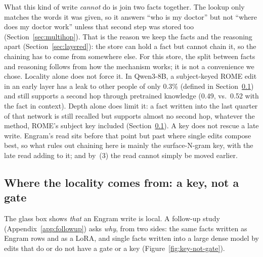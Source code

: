 \documentclass[11pt]{article}
\begin{document}
What this kind of write \emph{cannot} do is join two facts together.
The lookup only matches the words it was given, so it answers ``who is
my doctor'' but not ``where does my doctor work'' unless that second
step was stored too (Section~\ref{sec:multihop}). That is the reason we
keep the facts and the reasoning apart (Section~\ref{sec:layered}): the
store can hold a fact but cannot chain it, so the chaining has to come
from somewhere else. For this store, the split between facts and
reasoning follows from how the mechanism works; it is not a
convenience we chose. Locality alone does not force it. In Qwen3-8B, a
subject-keyed ROME edit in an early layer has a leak to other people
of only 0.3\% (defined in Section~\ref{sec:key-not-gate}) and still supports a second hop through pretrained
knowledge (0.49, vs.\ 0.52 with the fact in context). Depth alone
does limit it: a fact written into the last quarter of that network
is still recalled but supports almost no second hop, whatever the
method, ROME's subject key included
(Section~\ref{sec:key-not-gate}). A key does not rescue a late write.
Engram's read sits before that point but past where single edits
compose best, so what rules out chaining here is mainly the
surface-N-gram key, with the late read adding to it; and by~(3) the
read cannot simply be moved earlier.

\subsection{Where the locality comes from: a key, not a gate}
\label{sec:key-not-gate}

The glass box shows \emph{that} an Engram write is local. A follow-up
study (Appendix~\ref{app:followup}) asks \emph{why}, from two sides:
the same facts written as Engram rows and as a LoRA, and single facts
written into a large dense model by edits that do or do not have a
gate or a key (Figure~\ref{fig:key-not-gate}).
\end{document}
